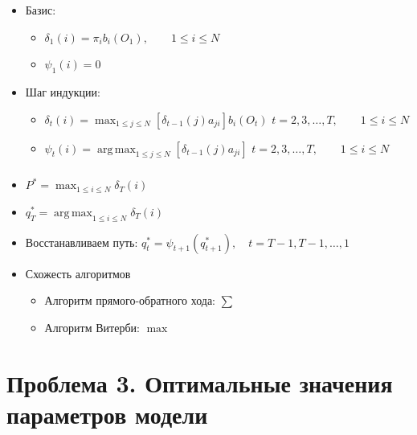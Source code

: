 \documentclass{beamer}
\DeclareMathOperator*{\argmax}{arg\,max}
\begin{document}
\begin{frame}
  \frametitle{\insertsection}
  \framesubtitle{\insertsubsection}
  \begin{itemize}
  \item Базис:
    \begin{itemize}
      \item $ \delta_1(i) = \pi_i b_i(O_1), \qquad 1 \le i \le N$ \\
      \item $\psi_1(i) = 0$
    \end{itemize}
    \pause
  \item Шаг индукции:
    \begin{itemize}
      \item $\displaystyle \delta_{t}(i) = \max_{1 \le j \le N}[\delta_{t - 1}(j) a_{ji}]b_{i}(O_{t})$
    $t = 2, 3, \ldots, T, \qquad 1 \le i \le N$ \\
        \pause
      \item $\displaystyle \psi_{t}(i) = \argmax_{1 \le j \le N}[\delta_{t - 1}(j) a_{ji}]$
        $t = 2, 3, \ldots, T, \qquad 1 \le i \le N$
    \end{itemize}
  \end{itemize}
\end{frame}

\begin{frame}
  \frametitle{\insertsection}
  \framesubtitle{\insertsubsection}
  \begin{itemize}
  \item $\displaystyle P^{\text{*}} = \max_{1 \le i \le N} \delta_T(i)$
    \pause
  \item $\displaystyle q^{\text{*}}_T = \argmax_{1 \le i \le N} \delta_T(i)$ \pause
  \item Восстанавливаем путь: $q^{\text{*}}_t = \psi_{t + 1}(q^{\text{*}}_{t + 1}), \quad t = T - 1, T - 1, \ldots, 1$
  \item \pause
    Схожесть алгоритмов
    \begin{itemize}
    \item Алгоритм прямого-обратного хода: $\sum$
    \item Алгоритм Витерби: $\max$
    \end{itemize}

  \end{itemize}
\end{frame}

\section{Проблема 3. Оптимальные значения параметров модели}
\end{document}
